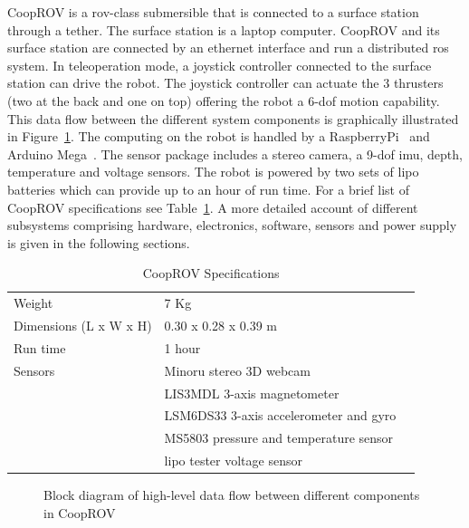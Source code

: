 \documentclass {udthesis}
\begin{document}
CoopROV is a \gls{rov}-class submersible that is connected to a surface station through a tether. The surface station is a laptop computer. CoopROV and its surface station are connected by an ethernet interface and run a distributed \gls{ros} system. In teleoperation mode, a joystick controller connected to the surface station can drive the robot. The joystick controller can actuate the 3 thrusters (two at the back and one on top) offering the robot a 6-\gls{dof} motion capability. This data flow between the different system components is graphically illustrated in Figure~\ref{fig:cooprov_dataflow}. The computing on the robot is handled by a RaspberryPi~\cite{raspberrypi} and Arduino Mega~\cite{arduino}. The sensor package includes a stereo camera, a 9-\gls{dof} \gls{imu}, depth, temperature and voltage sensors. The robot is powered by two sets of \gls{lipo} batteries which can provide up to an hour of run time. For a brief list of CoopROV specifications see Table~\ref{tab:cooprov_specs}. A more detailed 
account of 
different subsystems comprising hardware, electronics, software, sensors and power supply is given in the following sections.
%
\begin{table}	
  \begin{tabular}{lll} 
  \toprule
  Weight			&7 Kg\\
  Dimensions (L x W x H)	&0.30 x 0.28 x 0.39 m\\
  Run time			&1 hour\\
  Sensors			&Minoru stereo 3D webcam \\
				&LIS3MDL 3-axis magnetometer	\\
				&LSM6DS33 3-axis accelerometer and gyro\\
				&MS5803 pressure and temperature sensor\\
				&\gls{lipo} tester voltage sensor\\
  \bottomrule
  \end{tabular}
  \caption{CoopROV Specifications}
  \label{tab:cooprov_specs}
\end{table}
  
\begin{figure} 
  \centering
\caption[CoopROV data-flow diagram]{Block diagram of high-level data flow between different components in CoopROV}
\label{fig:cooprov_dataflow}
\end{figure}
\end{document}
